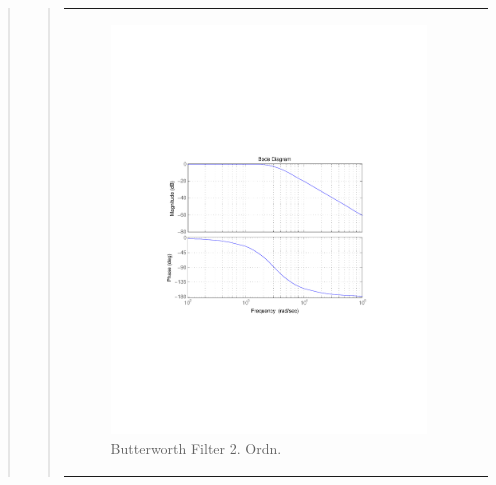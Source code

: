 \begin{quote}
\begin{quote}
\begin{center}
\begin{tabular}{ll}
\begin{minipage}{0.6\textwidth}
                \begin{figure}[H]
                    \label{fig:butter_2} 
                    \includegraphics[scale=0.7, trim = 3.5cm 7cm 3.5cm 7cm, clip]{Bilder/butter_2} %
                    \caption{Butterworth Filter 2. Ordn.}
                \end{figure}

            \end{minipage}
        

\end{tabular}
\end{center}
\end{quote}
\end{quote}
